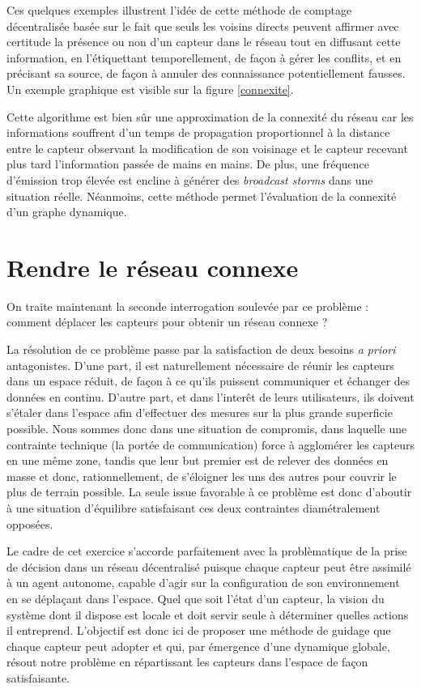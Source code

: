 \documentclass[10pt]{article}
\begin{document}
\begin{multicols}{2}
Ces quelques exemples illustrent l'idée de cette méthode de comptage
décentralisée basée sur le fait que seuls les voisins directs peuvent
affirmer avec certitude la présence ou non d'un capteur dans le réseau
tout en diffusant cette information, en l'étiquettant temporellement,
de façon à gérer les conflits, et en précisant sa source, de façon à
annuler des connaissance potentiellement fausses. Un exemple graphique
est visible sur la figure \ref{connexite}.

Cette algorithme est bien sûr une approximation de la connexité du
réseau car les informations souffrent d'un temps de propagation
proportionnel à la distance entre le capteur observant la modification
de son voisinage et le capteur recevant plus tard l'information passée
de mains en mains. De plus, une fréquence d'émission trop élevée est
encline à générer des \textit{broadcast storms} dans une situation
réelle. Néanmoins, cette méthode permet l'évaluation de la connexité
d'un graphe dynamique.

\section{Rendre le réseau connexe}

On traite maintenant la seconde interrogation soulevée par ce problème
: comment déplacer les capteurs pour obtenir un réseau connexe ?

La résolution de ce problème passe par la satisfaction de deux besoins
\textit{a priori} antagonistes. D'une part, il est naturellement
nécessaire de réunir les capteurs dans un espace réduit, de façon à ce
qu'ils puissent communiquer et échanger des données en
continu. D'autre part, et dans l'interêt de leurs utilisateurs, ils
doivent s'étaler dans l'espace afin d'effectuer des mesures sur la
plus grande superficie possible. Nous sommes donc dans une situation
de compromis, dans laquelle une contrainte technique (la portée de
communication) force à agglomérer les capteurs en une même zone,
tandis que leur but premier est de relever des données en masse et
donc, rationnellement, de s'éloigner les uns des autres pour couvrir
le plus de terrain possible. La seule issue favorable à ce problème
est donc d'aboutir à une situation d'équilibre satisfaisant ces deux
contraintes diamétralement opposées.

Le cadre de cet exercice s'accorde parfaitement avec la problèmatique
de la prise de décision dans un réseau décentralisé puisque chaque
capteur peut être assimilé à un agent autonome, capable d'agir sur la
configuration de son environnement en se déplaçant dans l'espace. Quel
que soit l'état d'un capteur, la vision du système dont il dispose est
locale et doit servir seule à déterminer quelles actions il
entreprend. L'objectif est donc ici de proposer une méthode de guidage
que chaque capteur peut adopter et qui, par émergence d'une dynamique
globale, résout notre problème en répartissant les capteurs dans
l'espace de façon satisfaisante.


\end{multicols}
\end{document}
